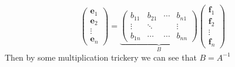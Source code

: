 \documentclass[12pt]{article}
\begin{document}
\[\begin{pmatrix}
    \textbf{e}_1 \\
    \textbf{e}_2 \\
    \vdots \\
    \textbf{e}_n
\end{pmatrix}=\underbrace{\begin{pmatrix}
    b_{11} & b_{21} & \cdots & b_{n1} \\
    \vdots & \ddots &  & \vdots \\
    b_{1n} & \cdots & \cdots & b_{nn}
\end{pmatrix}}_{B}\begin{pmatrix}
    \textbf{f}_1 \\
    \textbf{f}_2 \\
    \vdots \\
    \textbf{f}_n
\end{pmatrix}\]
Then by some multiplication trickery we can see that \(B=A^{-1}\)
\end{document}
